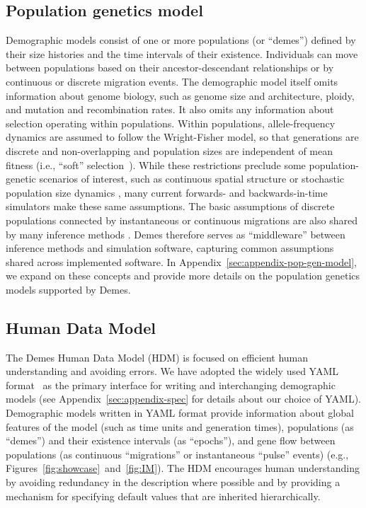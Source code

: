 \documentclass[11pt]{article}
\begin{document}
\subsection*{Population genetics model}

Demographic models consist of one or more populations (or ``demes'') defined
by their size histories and the time intervals of their existence.
Individuals can move between populations based on their ancestor-descendant
relationships  or by continuous or discrete migration events.
The demographic model itself omits information about genome biology, such as
genome size and architecture, ploidy, and mutation and recombination rates.
It also omits any information about selection operating within populations.
Within populations, allele-frequency dynamics are assumed to
follow the Wright-Fisher model, so that generations are discrete and
non-overlapping and population sizes are independent of mean fitness
(i.e., ``soft'' selection~\citep{christiansen1975hard}).
While these restrictions preclude some population-genetic scenarios of
interest, such as continuous spatial structure
\citep{wright1943isolation,barton2002neutral,barton2010new,
ringbauer2017inferring,battey2020space}
or stochastic population size dynamics
\citep{nunney1993assessing,orr2014population},
many current forwards- and backwards-in-time simulators
make these same assumptions.
The basic assumptions of discrete populations connected by instantaneous or continuous
migrations are also shared by many inference methods
\citep[e.g.,][]{gutenkunst2009inferring,gravel2012population,kamm2017efficient,
jouganous2017inferring,ragsdale2019models,excoffier2021fastsimcoal2}.
Demes therefore serves as ``middleware'' between inference methods and simulation
software, capturing common assumptions shared across implemented software.
In Appendix~\ref{sec:appendix-pop-gen-model}, we expand on these concepts
and provide more details on the population genetics models supported by Demes.

\subsection*{Human Data Model}

The Demes Human Data Model (HDM) is focused on efficient human
understanding and avoiding errors.
We have adopted the widely used YAML format~\citep{ben2009yaml} as the
primary interface for writing and interchanging demographic models
(see Appendix~\ref{sec:appendix-spec} for details about our choice of
YAML).
Demographic models written in YAML format provide information about global
features of the model (such as time units and generation times),
populations (as ``demes'') and their existence intervals (as ``epochs''),
and gene flow between populations
(as continuous ``migrations'' or instantaneous ``pulse'' events)
(e.g., Figures~\ref{fig:showcase}~and~\ref{fig:IM}).
The HDM encourages human understanding by avoiding
redundancy in the description where possible and by providing a mechanism for
specifying default values that are inherited hierarchically.
\end{document}
